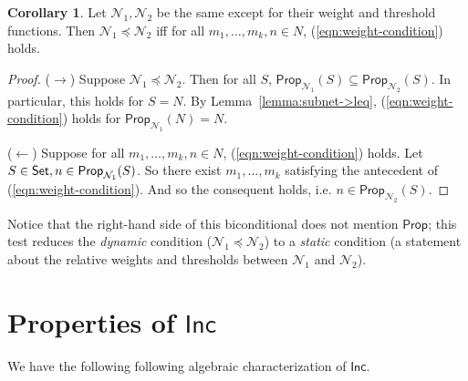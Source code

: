 \documentclass[12pt]{article}
\newcommand{\Set}{\mbox{\sf Set}}
\theoremstyle{definition}
\newtheorem{corollary}{Corollary}
\newcommand{\Prop}{\textsf{Prop}}
\newcommand{\Inc}{\textsf{Inc}}
\newcommand{\Net}{\mathcal{N}}
\begin{document}
\begin{corollary}
\label{corollary:subnet->weights}
Let $\Net_1, \Net_2$ be the same except for their weight and threshold functions.  Then $\Net_1 \preceq \Net_2$ iff for all $m_1, \ldots, m_k, n \in N$, (\ref{eqn:weight-condition}) holds.
\end{corollary}
\begin{proof}
($\rightarrow$) Suppose $\Net_1 \preceq \Net_2$.  Then for all $S$, $\Prop_{\Net_1}(S) \subseteq \Prop_{\Net_2}(S)$.  In particular, this holds for $S = N$.  By Lemma~\ref{lemma:subnet->leq}, (\ref{eqn:weight-condition}) holds for $\Prop_{\Net_1}(N) = N$.

($\leftarrow$) Suppose for all $m_1, \ldots, m_k, n \in N$, (\ref{eqn:weight-condition}) holds.  Let $S \in \Set, n \in \Prop_{\Net_1}(S)$.  So there exist $m_1, \ldots, m_k$ satisfying the antecedent of (\ref{eqn:weight-condition}).  And so the consequent holds, i.e. $n \in \Prop_{\Net_2}(S)$.
\end{proof}

Notice that the right-hand side of this biconditional does not mention $\Prop$; this test reduces the \emph{dynamic} condition ($\Net_1 \preceq \Net_2$) to a \emph{static} condition (a statement about the relative weights and thresholds between $\Net_1$ and $\Net_2$).

\section{\textcolor{myblue}{Properties of $\Inc$}}

We have the following following algebraic characterization of $\Inc$.
\end{document}
